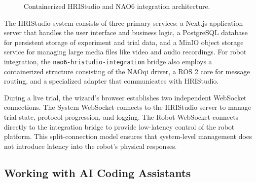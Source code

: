 \begin{figure}[htbp]
\caption{Containerized HRIStudio and NAO6 integration architecture.}
\label{fig:system-architecture}
\end{figure}

The HRIStudio system consists of three primary services: a Next.js application server that handles the user interface and business logic, a PostgreSQL database for persistent storage of experiment and trial data, and a MinIO object storage service for managing large media files like video and audio recordings. For robot integration, the \texttt{nao6-hristudio-integration} bridge also employs a containerized structure consisting of the NAOqi driver, a ROS 2 core for message routing, and a specialized adapter that communicates with HRIStudio.

During a live trial, the wizard's browser establishes two independent WebSocket connections. The System WebSocket connects to the HRIStudio server to manage trial state, protocol progression, and logging. The Robot WebSocket connects directly to the integration bridge to provide low-latency control of the robot platform. This split-connection model ensures that system-level management does not introduce latency into the robot's physical responses.

\subsection{Working with AI Coding Assistants}
\label{sec:ai-ws}

